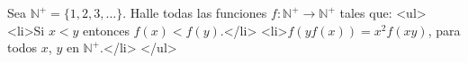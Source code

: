 Sea $\mathbb N^+=\{1,2,3,\dots \}$. Halle todas las funciones $f: \mathbb N^+\to \mathbb N^+$ tales que:
<ul>
<li>Si $x\lt y$ entonces $f(x) \lt f(y)$.</li>
<li>$f\left(yf(x)\right)=x^2f(xy)$, para todos $x$, $y$ en $\mathbb N^+$.</li>
</ul>
